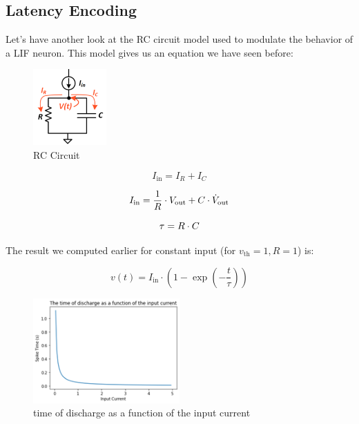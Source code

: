 \subsection{Latency Encoding} \label{ssec:latency-encoding}

Let's have another look at the RC circuit model used to modulate the behavior of a LIF neuron. This model gives us an equation we have seen before:

\begin{figure}[H]
    \centering
    \includegraphics[width=0.25\textwidth]{methods/spike-encoding/graphs/LIF-circuit.png}
    \caption{RC Circuit}
    \label{image:RC_circuit}
\end{figure}

\begin{equation}
    I_{\text{in}} = I_R + I_C
\end{equation}

\begin{equation}
    I_{\text{in}} = \frac{1}{R} \cdot V_{\text{out}} + C \cdot \dot{V}_{\text{out}} \notag
\end{equation}

\begin{equation}
    \tau = R \cdot C \notag
\end{equation}


The result we computed earlier for constant input (for $v_{\text{th}} = 1, R = 1$) is:

\begin{equation}
    v(t) = I_{\text{in}} \cdot \left(1 - \exp\left(-\frac{t}{\tau}\right)\right)
\end{equation}

\begin{figure}[H]
    \centering
    \includegraphics[width=0.5\textwidth]{methods/spike-encoding/graphs/exponential-decay.png}
    \caption{time of discharge as a function of the input current}
    \label{image:exponential_decay}
\end{figure}

